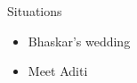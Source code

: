 \begin{frame}{Situations}


\begin{itemize}
\item Bhaskar's wedding
\item Meet Aditi 
\end{itemize}

\end{frame}
